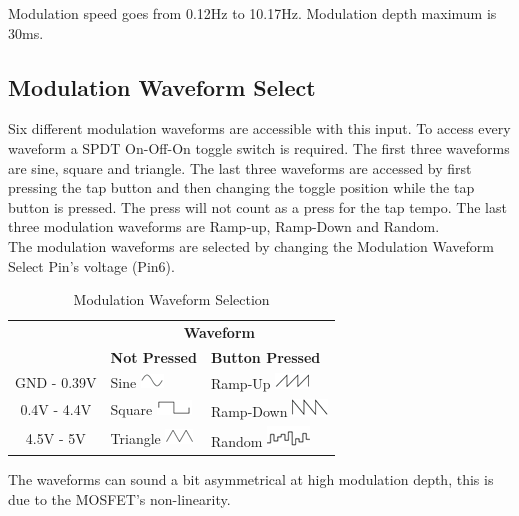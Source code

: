 \documentclass[a4paper, 10pt]{article}
\begin{document}
Modulation speed goes from 0.12Hz to 10.17Hz. Modulation depth maximum is 30ms.\\

\subsection{Modulation Waveform Select}
\label{subsec:waveformsel}
\bigbreak
Six different modulation waveforms are accessible with this input. To access every waveform a SPDT On-Off-On toggle switch is required. 
The first three waveforms are sine, square and triangle. The last three waveforms are accessed by first pressing the tap button and then changing the toggle position while the tap button is pressed. The press will not count as a press for the tap tempo. The last three modulation waveforms are Ramp-up, Ramp-Down and Random.\\

The modulation waveforms are selected by changing the Modulation Waveform Select Pin's voltage (Pin6).\\
\newpage
\begin{table}[h!]
\centering
\begin{tabular}{|c|l|l|}
\hline
\rowcolor{lightgray} & \multicolumn{2}{c|}{{\Large\textbf{Waveform}}}\\
\hhline{|>{\arrayrulecolor{lightgray}}->{\arrayrulecolor{black}}|--|}
\rowcolor{lightgray}\multirow{-2}{5cm}{\centering{\Large\textbf{Pin 6 Voltage}}} & {\centering\large\textbf{Not Pressed}} & {\centering\large\textbf{Button Pressed}}\\
\hline
GND - 0.39V & Sine \hfill \includegraphics[scale=1]{sine} & Ramp-Up \hfill \includegraphics[scale=1]{rampup}\\
\hline
0.4V - 4.4V & Square \hfill \includegraphics[scale=1]{square}& Ramp-Down \hfill \includegraphics[scale=1]{rampdown}\\
\hline
4.5V - 5V & Triangle \hfill \includegraphics[scale=1]{triangle} & Random \hfill \includegraphics[scale=1]{random}\\
\hline
\end{tabular}
\caption{Modulation Waveform Selection}
\end{table}
The waveforms can sound a bit asymmetrical at high modulation depth, this is due to the MOSFET’s non-linearity. \\
\end{document}
